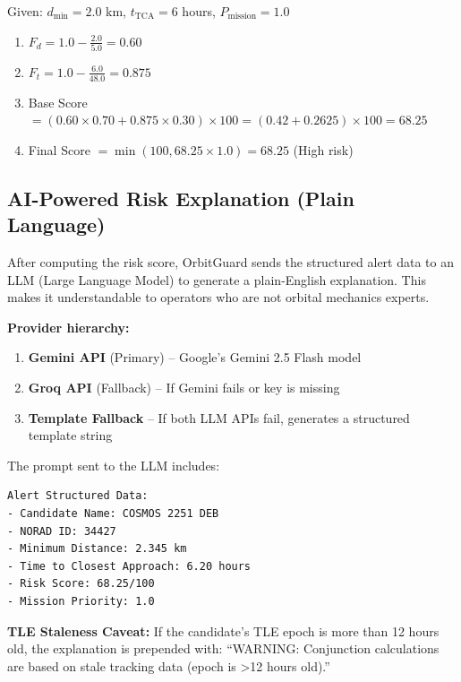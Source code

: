 \documentclass[12pt,a4paper]{article}
\begin{document}
\begin{realdatabox}[title=Worked Example: Risk Score for a 2.0 km Approach in 6 Hours]
Given: $d_{\min} = 2.0$ km, $t_{\text{TCA}} = 6$ hours, $P_{\text{mission}} = 1.0$
\begin{enumerate}
    \item $F_d = 1.0 - \frac{2.0}{5.0} = 0.60$
    \item $F_t = 1.0 - \frac{6.0}{48.0} = 0.875$
    \item Base Score $= (0.60 \times 0.70 + 0.875 \times 0.30) \times 100 = (0.42 + 0.2625) \times 100 = 68.25$
    \item Final Score $= \min(100, 68.25 \times 1.0) = \mathbf{68.25}$ (High risk)
\end{enumerate}
\end{realdatabox}

\subsection{AI-Powered Risk Explanation (Plain Language)}

After computing the risk score, OrbitGuard sends the structured alert data to an LLM (Large Language Model) to generate a plain-English explanation. This makes it understandable to operators who are not orbital mechanics experts.

\textbf{Provider hierarchy:}
\begin{enumerate}
    \item \textbf{Gemini API} (Primary) -- Google's Gemini 2.5 Flash model
    \item \textbf{Groq API} (Fallback) -- If Gemini fails or key is missing
    \item \textbf{Template Fallback} -- If both LLM APIs fail, generates a structured template string
\end{enumerate}

The prompt sent to the LLM includes:
\begin{lstlisting}[language={}]
Alert Structured Data:
- Candidate Name: COSMOS 2251 DEB
- NORAD ID: 34427
- Minimum Distance: 2.345 km
- Time to Closest Approach: 6.20 hours
- Risk Score: 68.25/100
- Mission Priority: 1.0
\end{lstlisting}

\textbf{TLE Staleness Caveat:} If the candidate's TLE epoch is more than 12 hours old, the explanation is prepended with: ``WARNING: Conjunction calculations are based on stale tracking data (epoch is >12 hours old).''
\end{document}
